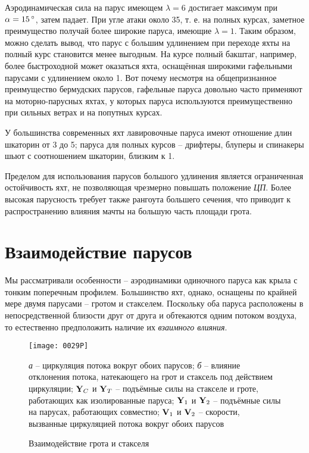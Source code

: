 Аэродинамическая сила на парус имеющем $\lambda = 6$ достигает
максимум при $\alpha = 15\,^\circ$, затем падает. При угле атаки около
35\gr, т. е. на полных курсах, заметное преимущество получай более
широкие паруса, имеющие $\lambda = 1$. Таким образом, можно сделать
вывод, что парус с большим удлинением при переходе яхты на полный курс
становится менее выгодным. На курсе полный бакштаг, например, более
быстроходной может оказаться яхта, оснащённая широкими гафельными
парусами с удлинением около 1. Вот почему несмотря на общепризнанное
преимущество бермудских парусов, гафельные паруса довольно часто
применяют на моторно-парусных яхтах, у которых паруса используются
преимущественно при сильных ветрах и на попутных курсах.

У большинства современных яхт лавировочные паруса имеют отношение длин
шкаторин от 3 до 5; паруса для полных курсов \--- дрифтеры, блуперы
 и спинакеры шьют с соотношением
шкаторин, близким к 1.

Пределом для использования парусов большого удлинения является
ограниченная остойчивость яхт, не позволяющая чрезмерно повышать
положение \textit{ЦП}. Более высокая парусность требует также рангоута
большего сечения, что приводит к распространению влияния мачты на
большую часть площади грота.

\section{Взаимодействие парусов}

Мы рассматривали особенности \--- аэродинамики одиночного паруса как
крыла с тонким поперечным профилем. Большинство яхт, однако, оснащены
по крайней мере двумя парусами \--- гротом и стакселем. Поскольку оба
паруса расположены в непосредственной близости друг от друга и
обтекаются одним потоком воздуха, то естественно предположить наличие
их \textit{взаимного влияния}.

\begin{figure}[!htb]
  \centering
  \texttt{[image: 0029P]}
  \caption{Взаимодействие грота и стакселя}
  \label{fig:29}
  \small
  \centering{}
  \textit{а} \--- циркуляция потока вокруг обоих парусов; \textit{б} \--- влияние отклонения потока, натекающего на грот и стаксель под действием циркуляции; $\mathbf{Y}_C$ и $\mathbf{Y}_T$ \--- подъёмные силы на стакселе и гроте, работающих как изолированные паруса; $\mathbf{Y}_1$ и $\mathbf{Y}_2$ \--- подъёмные силы на парусах, работающих совместно; $\mathbf{V}_1$ и $\mathbf{V}_2$ \--- скорости, вызванные циркуляцией потока вокруг обоих парусов
\end{figure}

